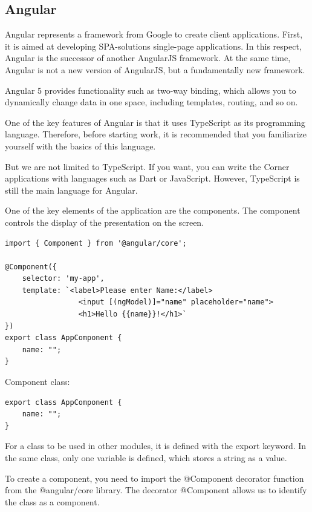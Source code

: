 \subsection{Angular}
Angular represents a framework from Google to create client applications. First, it is aimed at developing SPA-solutions single-page applications. In this respect, Angular is the successor of another AngularJS framework. At the same time, Angular is not a new version of AngularJS, but a fundamentally new framework.\par
Angular 5 provides functionality such as two-way binding, which allows you to dynamically change data in one space, including templates, routing, and so on.\par
One of the key features of Angular is that it uses TypeScript as its programming language. Therefore, before starting work, it is recommended that you familiarize yourself with the basics of this language.\par
But we are not limited to TypeScript. If you want, you can write the Corner applications with languages such as Dart or JavaScript. However, TypeScript is still the main language for Angular. \par
One of the key elements of the application are the components. The component controls the display of the presentation on the screen. \cite{Angular}

\begin{verbatim}
import { Component } from '@angular/core';

@Component({
    selector: 'my-app',
    template: `<label>Please enter Name:</label>
                 <input [(ngModel)]="name" placeholder="name">
                 <h1>Hello {{name}}!</h1>`
})
export class AppComponent { 
    name: "";
}
\end{verbatim}

Component class:

\begin{verbatim}
export class AppComponent { 
    name: "";
}
\end{verbatim}

For a class to be used in other modules, it is defined with the export keyword. In the same class, only one variable is defined, which stores a string as a value.

To create a component, you need to import the @Component decorator function from the @angular/core library. The decorator @Component allows us to identify the class as a component.

